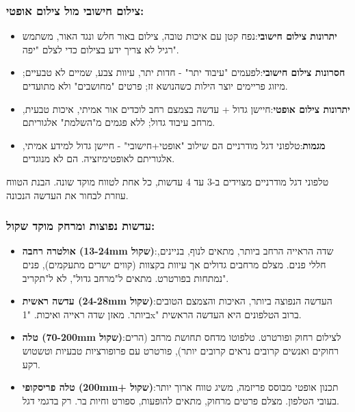 \subsubsection*{צילום חישובי מול צילום אופטי:}

\begin{itemize}
  \item \textbf{יתרונות צילום חישובי}:נפח קטן עם איכות טובה, צילום באור חלש ונגד האור, משתמש רגיל לא צריך ידע בצילום כדי לצלם "יפה".
  \item \textbf{חסרונות צילום חישובי}:לפעמים "עיבוד יתר" - חדות יתר, עיוות צבע, שמיים לא טבעיים; מיזוג פריימים יוצר הילות כשהנושא זז; פרטים "מחושבים" ולא מתועדים.
  \item \textbf{יתרונות צילום אופטי}:חיישן גדול + עדשה בצמצם רחב לוכדים אור אמיתי, איכות טבעית, מרחב עיבוד גדול; ללא פגמים מ"השלמת" אלגוריתם.
  \item \textbf{מגמות}:טלפוני דגל מודרניים הם שילוב "אופטי+חישובי" - חיישן גדול למידע אמיתי, אלגוריתם לאופטימיזציה. הם לא מנוגדים.
\end{itemize}


טלפוני דגל מודרניים מצוידים ב-3 עד 4 עדשות, כל אחת לטווח מוקד שונה. הבנת הטווח עוזרת לבחור את העדשה הנכונה.

\subsubsection*{עדשות נפוצות ומרחק מוקד שקול:}

\begin{itemize}
  \item \textbf{אולטרה רחבה (13-24mm שקול)}:שדה הראייה הרחב ביותר, מתאים לנוף, בניינים, חללי פנים. מצלם מרחבים גדולים אך עיוות בקצוות (קווים ישרים מתעקמים), פנים נמתחות בפורטרט. מתאים ל"מרחב גדול", לא ל"תקריב".
  \item \textbf{עדשה ראשית (24-28mm שקול)}:העדשה הנפוצה ביותר, האיכות והצמצם הטובים ביותר. מאזן שדה ראייה ואיכות. "1x" ברוב הטלפונים היא העדשה הראשית.
  \item \textbf{טלה (70-200mm שקול)}:לצילום רחוק ופורטרט. טלפוטו מדחס תחושת מרחב (הרים רחוקים ואנשים קרובים נראים קרובים יותר), פורטרט עם פרופורציות טבעיות וטשטוש רקע.
  \item \textbf{טלה פריסקופי (200mm+ שקול)}:תכנון אופטי מבוסס פריזמה, משיג טווח ארוך יותר בעובי הטלפון. מצלם פרטים מרחוק, מתאים להופעות, ספורט וחיות בר. רק בדגמי דגל.
\end{itemize}

